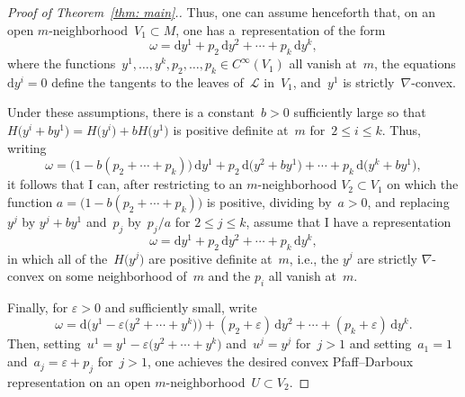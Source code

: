 \documentclass[pdftex]{sigma}
\renewcommand{\d}{\mathrm{d}}%
\newcommand{\cL}{{\mathcal L}}
\numberwithin{equation}{section}
\begin{document}
\begin{proof}[Proof of Theorem~\ref{thm: main}.]
Thus, one can assume henceforth that,
on an open $m$-neighborhood~$V_1\subset M$,
one has a~representation of the form
\[
\omega = \d y^1 + p_2\,\d y^2 +\cdots + p_k\,\d y^k,
\]
where the functions~$y^1,\ldots,y^k,p_2,\ldots,p_k\in C^\infty(V_1)$
all vanish at~$m$,
the equations $\d y^i=0$ define the tangents to the leaves of~$\cL$ in~$V_1$,
and~$y^1$ is strictly~$\nabla$-convex.

Under these assumptions, there is a constant~$b>0$ sufficiently large
so that $H\big(y^i+by^1\big) = H\big(y^i\big)+b H\big(y^1\big)$ is positive definite at~$m$
for~$2\le i\le k$.
Thus, writing
\[
\omega = \bigl(1-b(p_2{+}\cdots{+}p_k)\bigr)\,\d y^1 + p_2\,\d\big(y^2+b y^1\big)
   + \cdots + p_k\,\d\big(y^k+b y^1\big),
\]
it follows that I can,
after restricting to an $m$-neighborhood $V_2\subset V_1$ on which
the function $a = \bigl(1-b(p_2{+}\cdots{+}p_k)\bigr)$ is positive,
dividing by~$a>0$,
and replacing~$y^j$ by $y^j+by^1$ and~$p_j$ by~$p_j/a$ for $2\le j\le k$,
assume that I have a representation
\[
\omega = \d y^1 + p_2\,\d y^2 +\cdots + p_k\,\d y^k,
\]
in which all of the~$H\big(y^j\big)$ are positive definite at~$m$,
i.e., the $y^j$ are strictly $\nabla$-convex on some neighborhood of~$m$
and the $p_i$ all vanish at~$m$.

Finally, for $\varepsilon>0$ and sufficiently small, write
\[
\omega = \d\bigl(y^1-\varepsilon\big(y^2{+}\cdots{+}y^k\big)\bigr)
   + (p_2 + \varepsilon)\,\d y^2
   + \cdots + (p_k + \varepsilon)\,\d y^k.
\]
Then, setting~$u^1 = y^1-\varepsilon\big(y^2+\cdots+y^k\big)$ and~$u^j = y^j$
for~$j>1$ and setting~$a_1 = 1$ and~${a_j = \varepsilon + p_j}$ for~$j>1$,
one achieves the desired convex Pfaff--Darboux representation
on an open $m$-neigh\-bor\-hood~$U\subset V_2$.
\end{proof}
\end{document}
